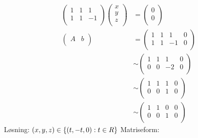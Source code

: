   \begin{align*}
    \begin{pmatrix}
      1 & 1 & 1\\ 
      1 & 1 & -1\\
    \end{pmatrix}
    \begin{pmatrix}
      x \\
      y \\
      z \\
    \end{pmatrix}
    &=
    \begin{pmatrix}
      0 \\
      0 \\
    \end{pmatrix}
    \\
    \begin{pmatrix}
      A & b \\
    \end{pmatrix}
        &=
          \begin{pmatrix}
      1 & 1 & 1 & 0 \\ 
      1 & 1 & -1 & 0 \\
    \end{pmatrix}
    \\
        &\sim
          \begin{pmatrix}
            1 & 1 & 1 & 0 \\ 
            0 & 0 & -2 & 0 \\
          \end{pmatrix}
\\ 
    &\sim
    \begin{pmatrix}
      1 & 1 & 1 & 0 \\ 
      0 & 0 & 1 & 0 \\
    \end{pmatrix}
    \\
    &\sim
    \begin{pmatrix}
      1 & 1 & 0 & 0 \\ 
      0 & 0 & 1 & 0 \\
    \end{pmatrix}
  \end{align*}
  Løsning: $(x, y, z) \in \left\{ (t, -t, 0): t \in R \right \}$
  Matriseform: 
